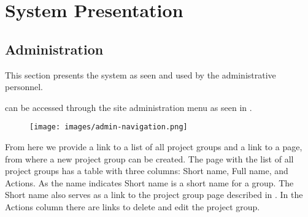 \chapter{System Presentation}
\label{sub:page}





\section{Administration}
This section presents the system as seen and used by the administrative personnel.

can be accessed through the site administration menu as seen in .

\begin{figure}[htb]
	\centering
		\texttt{[image: images/admin-navigation.png]}
	\label{fig:navigation}
\end{figure}

From here we provide a link to a list of all project groups and a link to a page, from where a new project group can be created.
The page with the list of all project groups has a table with three columns: Short name, Full name, and Actions.
As the name indicates Short name is a short name for a group. 
The Short name also serves as a link to the project group page described in .
In the Actions column there are links to delete and edit the project group.
